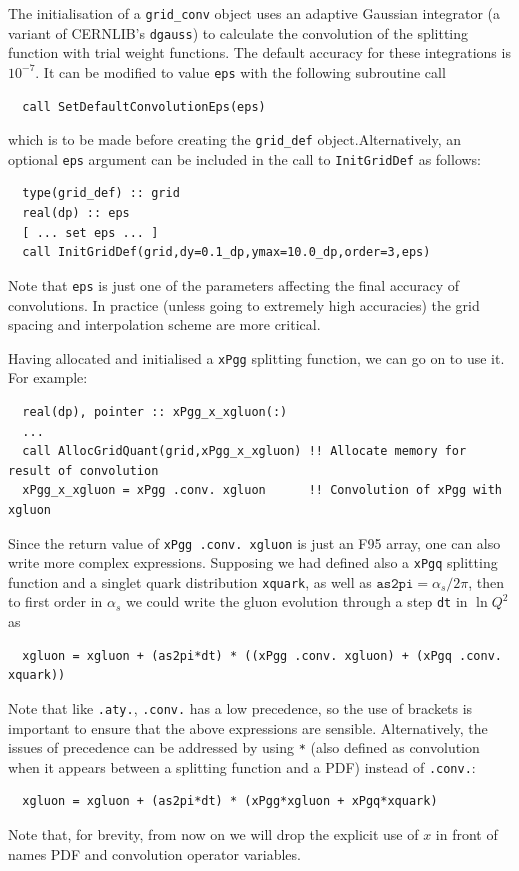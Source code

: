 \documentclass[12pt]{article}
\newcommand{\as}{\alpha_s}
\newcommand{\ttt}[1]{\texttt{#1}}
\begin{document}
The initialisation of a \texttt{grid\_conv} object uses an adaptive
Gaussian integrator (a variant of CERNLIB's \texttt{dgauss}) to
calculate the convolution of the splitting function with trial weight
functions. The default accuracy for these integrations is $10^{-7}$.
It can be modified to value \texttt{eps} with the following subroutine
call
\begin{lstlisting}
  call SetDefaultConvolutionEps(eps)
\end{lstlisting}
which is to be made before creating the \ttt{grid\_def}
object.Alternatively, an optional \ttt{eps} argument can be
  included in the call to \ttt{InitGridDef} as follows:
\begin{lstlisting}
  type(grid_def) :: grid
  real(dp) :: eps
  [ ... set eps ... ]
  call InitGridDef(grid,dy=0.1_dp,ymax=10.0_dp,order=3,eps)
 \end{lstlisting}
Note that {\tt eps} is just
one of the parameters affecting the final accuracy of convolutions. In
practice (unless going to extremely high accuracies) the grid spacing
and interpolation scheme are more critical.

Having allocated and initialised a \texttt{xPgg} splitting function, we
can go on to use it. For example: 
\begin{lstlisting}
  real(dp), pointer :: xPgg_x_xgluon(:)
  ...
  call AllocGridQuant(grid,xPgg_x_xgluon) !! Allocate memory for result of convolution
  xPgg_x_xgluon = xPgg .conv. xgluon      !! Convolution of xPgg with xgluon
\end{lstlisting}  
Since the return value of \texttt{xPgg .conv.\ xgluon} is just an F95
array, one can also write more complex expressions. Supposing we had
defined also a \texttt{xPgq} splitting function and a singlet
quark distribution \ttt{xquark}, 
as well as $\texttt{as2pi} = \as/2\pi$,
then to first order in $\as$ we could write the gluon evolution
through a step \texttt{dt} in $\ln Q^2$ as
\begin{lstlisting}
  xgluon = xgluon + (as2pi*dt) * ((xPgg .conv. xgluon) + (xPgq .conv. xquark))
\end{lstlisting}
Note that like \texttt{.aty.}, \texttt{.conv.} has a low precedence,
so the use of brackets is important to ensure that the above
expressions are sensible. Alternatively, the issues of precedence can
be addressed by using \texttt{*} (also defined as convolution when it
appears between a splitting function and a PDF) instead of
\texttt{.conv.}:
\begin{lstlisting}
  xgluon = xgluon + (as2pi*dt) * (xPgg*xgluon + xPgq*xquark)
\end{lstlisting}
Note that, for brevity, from now on we will drop the explicit use of
$x$ in front of names PDF and convolution operator variables.
\end{document}
